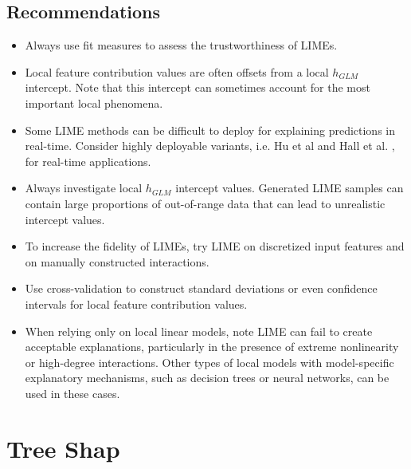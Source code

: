 \documentclass{article}
\begin{document}
\subsection{Recommendations}

\begin{itemize}
	
	\item Always use fit measures to assess the trustworthiness of LIMEs.

	\item Local feature contribution values are often offsets from a local $h_{GLM}$ intercept. Note that this intercept can sometimes account for the most important local phenomena.

	\item Some LIME methods can be difficult to deploy for explaining predictions in real-time. Consider highly deployable variants, i.e. Hu et al \citeyear {lime-sup} and Hall et al. \citeyear{h2o_mli_booklet}, for real-time applications.
		
	\item Always investigate local $h_{GLM}$ intercept values. Generated LIME samples can contain large proportions of out-of-range data that can lead to unrealistic intercept values. 
		
	\item To increase the fidelity of LIMEs, try LIME on discretized input features and on manually constructed interactions.
	
	\item Use cross-validation to construct standard deviations or even confidence intervals for local feature contribution values.
	
	\item When relying only on local linear models, note LIME can fail to create acceptable explanations, particularly in the presence of extreme nonlinearity or high-degree interactions. Other types of local models with model-specific explanatory mechanisms, such as decision trees or neural networks, can be used in these cases. 
	
\end{itemize}

\section{Tree Shap} \label{sec:shap}
\end{document}
